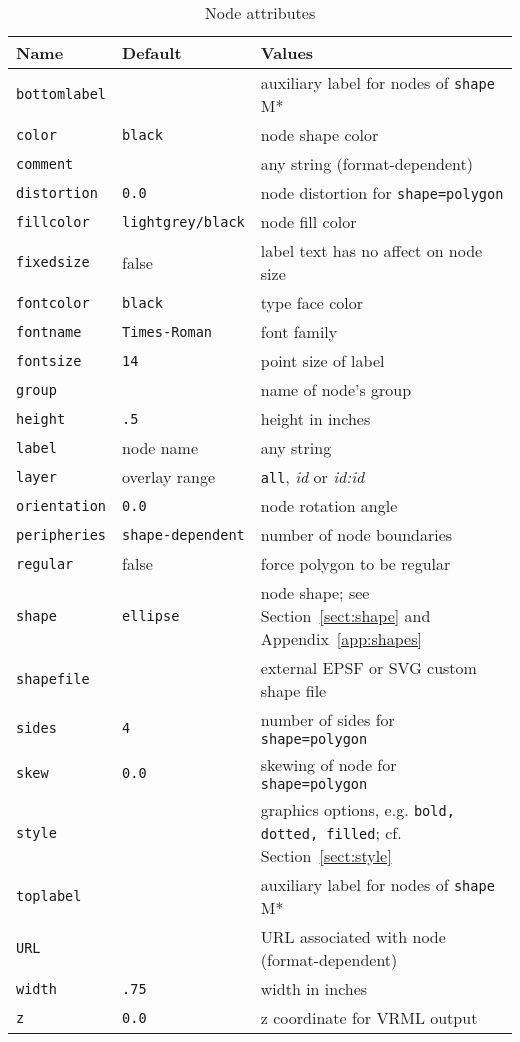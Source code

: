 \documentclass[11pt]{article}
\begin{document}
\begin{table}[p]
\begin{tabular}[t]{|l|l|p{3.0in}|} \hline
Name & Default & Values \\ \hline
{\tt bottomlabel} & & auxiliary label for nodes of {\tt shape} M* \\
{\tt color} & {\tt black} & node shape color \\
{\tt comment} & & any string (format-dependent) \\
{\tt distortion} & {\tt 0.0} & node distortion for {\tt shape=polygon} \\
{\tt fillcolor} & {\tt lightgrey/black} & node fill color \\
{\tt fixedsize} & false & label text has no affect on node size \\
{\tt fontcolor} & {\tt black} & type face color \\
{\tt fontname} & {\tt Times-Roman} & font family \\
{\tt fontsize} & {\tt 14} & point size of label \\
{\tt group} &  & name of node's group \\
{\tt height} & {\tt .5} & height in inches \\
{\tt label} & node name & any string \\
{\tt layer} & overlay range & {\tt all}, {\it id} or {\it id:id} \\
{\tt orientation} & {\tt 0.0} & node rotation angle \\
{\tt peripheries} & {\tt shape-dependent} & number of node boundaries \\
{\tt regular} & false & force polygon to be regular \\
{\tt shape} & {\tt ellipse} & node shape; see Section~\ref{sect:shape} and
Appendix~\ref{app:shapes}\\
{\tt shapefile} & & external EPSF or SVG custom shape file\\
{\tt sides} & {\tt 4} & number of sides for {\tt shape=polygon} \\
{\tt skew} & {\tt 0.0} & skewing of node for {\tt shape=polygon} \\
{\tt style} & & graphics options, e.g. {\tt bold, dotted, filled};
cf. Section~\ref{sect:style} \\ 
{\tt toplabel} & & auxiliary label for nodes of {\tt shape} M* \\
{\tt URL} & & URL associated with node (format-dependent) \\
{\tt width} & {\tt .75} & width in inches \\
{\tt z} & {\tt 0.0} & z coordinate for VRML output \\
\hline
\end{tabular}
\caption{Node attributes}
\label{tab:nattr}
\end{table}
\end{document}
